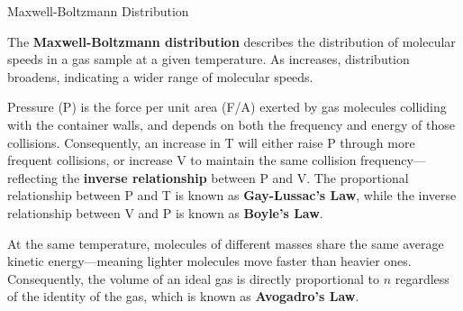 \documentclass[10pt]{article}
\begin{document}
    \begin{core}[label=core:max_boltz_dis]{Maxwell-Boltzmann Distribution}

      The \textbf{Maxwell-Boltzmann distribution} describes the distribution of molecular speeds in a gas sample at a given temperature. As  increases, distribution broadens, indicating a wider range of molecular speeds.


      Pressure (P) is the force per unit area (F/A) exerted by gas molecules colliding with the container walls, and depends on both the frequency and energy of those collisions. Consequently, an increase in T will either raise P through more frequent collisions, or increase V to maintain the same collision frequency---reflecting the \textbf{inverse relationship} between P and V. The proportional relationship between P and T is known as \textbf{Gay-Lussac's Law}, while the inverse relationship between V and P is known as \textbf{Boyle's Law}.

      At the same temperature, molecules of different masses share the same average kinetic energy---meaning lighter molecules move faster than heavier ones. Consequently, the volume of an ideal gas is directly proportional to $n$ regardless of the identity of the gas, which is known as \textbf{Avogadro's Law}.


\end{core}
\end{document}

